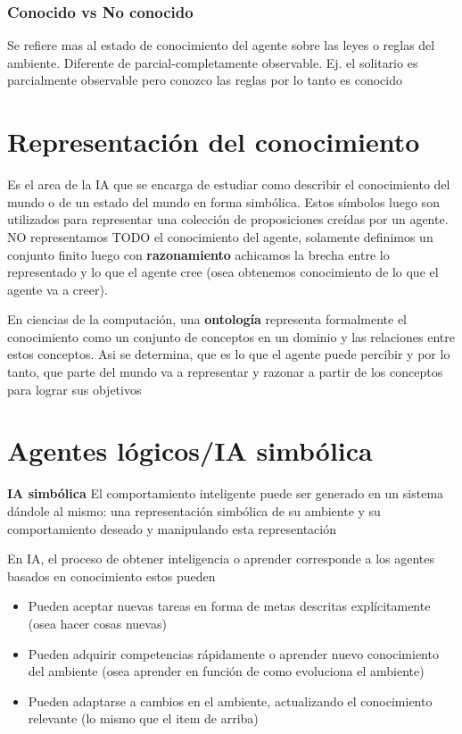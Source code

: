 \subsubsection*{Conocido vs No conocido}
Se refiere mas al estado de conocimiento del agente sobre las leyes o reglas del ambiente. Diferente de parcial-completamente observable. Ej. el solitario es parcialmente observable pero conozco las reglas por lo tanto es conocido

\section{Representación del conocimiento}
Es el area de la IA que se encarga de estudiar como describir el conocimiento del mundo o de un estado del mundo en forma simbólica. Estos símbolos luego son utilizados para representar una colección de proposiciones creídas por un agente. NO representamos TODO el conocimiento del agente, solamente definimos un conjunto finito luego con \textbf{razonamiento} achicamos la brecha entre lo representado y lo que el agente cree (osea obtenemos conocimiento de lo que el agente va a creer). 

En ciencias de la computación, una \textbf{ontología} representa formalmente el conocimiento como un conjunto de conceptos en un dominio y las relaciones entre estos conceptos. Asi se determina, que es lo que el agente puede percibir y por lo tanto, que parte del mundo va a representar y razonar a partir de los conceptos para lograr sus objetivos

\section{Agentes lógicos/IA simbólica}
\textbf{IA simbólica} El comportamiento inteligente puede ser generado en un sistema dándole al mismo: una representación simbólica de su ambiente y su comportamiento deseado y manipulando esta representación 

En IA, el proceso de obtener inteligencia o aprender corresponde a los agentes basados en conocimiento estos pueden
\begin{itemize}
  \item Pueden aceptar nuevas tareas en forma de metas descritas explícitamente (osea hacer cosas nuevas)
  \item Pueden adquirir competencias rápidamente o aprender nuevo conocimiento del ambiente (osea aprender en función de como evoluciona el ambiente)
  \item Pueden adaptarse a cambios en el ambiente, actualizando el conocimiento relevante (lo mismo que el item de arriba)
\end{itemize}

